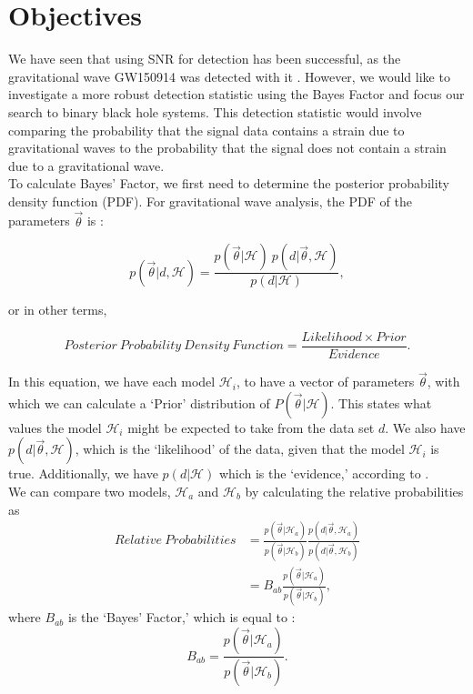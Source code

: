\documentclass{article}
\begin{document}
 
 \section{Objectives}
 
 We have seen that using SNR for detection has been successful, as the gravitational wave GW150914 was detected with it \cite{DetectionPaper}. However, we would like to investigate a more robust detection statistic using the Bayes Factor and focus our search to binary black hole systems. This detection statistic would involve comparing the probability that the signal data contains a strain due to gravitational waves to the probability that the signal does not contain a strain due to a gravitational wave. \\
 
 
 
 To calculate Bayes' Factor, we first need to determine the posterior probability density function (PDF). For gravitational wave analysis, the PDF of the parameters $\vec{\theta}$ is \cite{RSmith}:
 
\begin{equation} \label{eq:bayesTheorem}
p(\vec{\theta}|d, \mathcal{H})  = \frac{p(\vec{\theta}| \mathcal{H}) \ p(d|\vec{\theta},  \mathcal{H}) }  { p(d|\mathcal{H})},
\end{equation} 
 
 or in other terms, 
 
 \begin{equation} \label{eq:englishTheorem}
{ Posterior \ Probability \ Density \ Function}  = \frac{ Likelihood  \times Prior}{Evidence}. \nonumber
 \end{equation} 
 
 In this equation, we have each model $ \mathcal{H}_i$, to have a vector of parameters $\vec{\theta}$, with which we can calculate a `Prior' distribution of $P(\vec{\theta}| \mathcal{H})$. This states what values the model $ \mathcal{H}_i$ might be expected to take from the data set $d$. We also have $p(d|\vec{\theta},  \mathcal{H})$, which is the `likelihood' of the data, given that the model $ \mathcal{H}_i$ is true. Additionally, we have $p(d|\mathcal{H})$ which is the `evidence,' according to \cite{BaeStats}.\\
 
We can compare two models, $ \mathcal{H}_a$ and  $ \mathcal{H}_b$ by calculating the relative probabilities as 
 \begin{align} \label{eq:englishTheorem}
 Relative \ Probabilities &= \frac{p(\vec{\theta}| \mathcal{H}_a) }{p(\vec{\theta}| \mathcal{H}_b)} \frac{p(d|\vec{\theta},  \mathcal{H}_a)}{p(d|\vec{\theta},  \mathcal{H}_b)}\nonumber\\
 &= B_{ab} \frac{p(\vec{\theta}| \mathcal{H}_a) }{p(\vec{\theta}| \mathcal{H}_b)}, \nonumber
 \end{align} 
where $B_{ab}$ is the `Bayes' Factor,' which is equal to \cite{BaeStats}:\\
\begin{equation}
B_{ab} = \frac{p(\vec{\theta}| \mathcal{H}_a) }{p(\vec{\theta}| \mathcal{H}_b)}.
 \end{equation}
 
\end{document}
